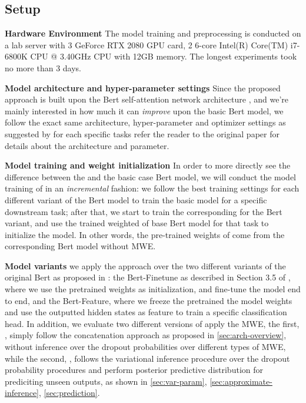 \subsection{Setup}

\noindent \textbf{Hardware Environment}
The model training and preprocessing is conducted on a lab server with 3 
GeForce RTX 2080 GPU card, 2 6-core Intel(R) Core(TM) i7-6800K CPU @ 3.40GHz CPU with 12GB memory. The longest experiments took no more than 3 days.


\noindent \textbf{Model architecture and hyper-parameter settings}
Since the proposed \BertMWE approach is built upon the Bert self-attention network architecture \cite{devlin2018bert},
and 
we're mainly interested in how much it can \textit{improve} upon the basic Bert model, 
we follow the exact same architecture, hyper-parameter and optimizer settings as suggested by 
\cite{devlin2018bert} for each specific tasks 
refer the reader to the original paper for details about the architecture and parameter.

\noindent \textbf{Model training and weight initialization}
In order to more directly see the difference between the \BertMWE and the basic case Bert model, we will conduct the model training of \BertMWE in an \textit{incremental} fashion:
we follow the best training settings for each different variant of the Bert model  to train the basic model for a specific downstream task; after that, we start to train the corresponding \BertMWE 
for the Bert variant, and use the trained weighted of base Bert model for that task to initialize the \BertMWE model. In other words, the pre-trained weights of \BertMWE come from the corresponding Bert model without MWE.

\noindent \textbf{Model variants}
we apply the \BertMWE approach over the two different variants of the original Bert as proposed in \cite{devlin2018bert}: the Bert-Finetune as described in Section 3.5 of \cite{devlin2018bert}, where we use the pretrained weights as initialization, and fine-tune the model end to end, and the Bert-Feature, where we freeze the pretrained the model weights and use the outputted hidden states as feature to train a specific classification head. In addition, we evaluate two different versions of apply the MWE, the first, \BertConcat, simply follow the concatenation approach as proposed in \autoref{sec:arch-overview}, without inference over the dropout probabilities over different types of MWE, while the second, \BertMWE, follows the variational inference procedure over the dropout probability procedures and perform posterior predictive distribution for prediciting unseen outputs, as shown in \autoref{sec:var-param}, \autoref{sec:approximate-inference}, \autoref{sec:prediction}.


